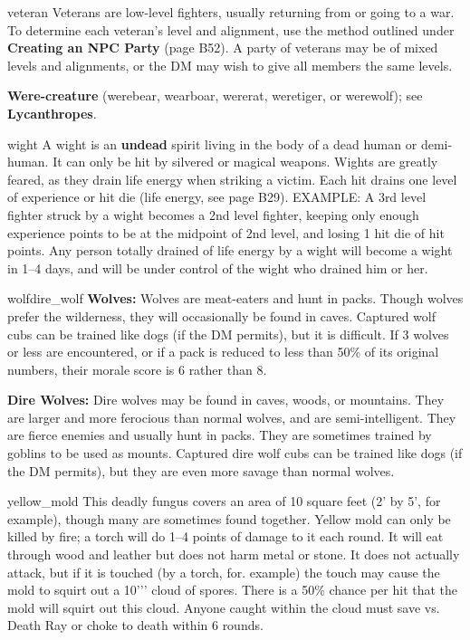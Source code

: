 \documentclass[letterpaper,serif,tightsqueeze]{module}
\begin{document}
\begin{newmonster}{veteran}
Veterans are low-level fighters, usually returning from or going to a
war. To determine each veteran's level and alignment, use the
method outlined under \textbf{Creating an NPC Party} (page B52). A
party of veterans may be of mixed levels and alignments, or the
DM may wish to give all members the same levels.
\end{newmonster}
\textbf{Were-creature} (werebear, wearboar, wererat, weretiger, or werewolf); see \textbf{Lycanthropes}.\\[1ex]
\begin{newmonster}{wight}
A wight is an \textbf{undead} spirit living in the body of a dead human or
demi-human. It can only be hit by silvered or magical weapons.
Wights are greatly feared, as they drain life energy when striking a
victim. Each hit drains one level of experience or hit die (life
energy, see page B29). EXAMPLE: A 3rd level fighter struck by a
wight becomes a 2nd level fighter, keeping only enough experience
points to be at the midpoint of 2nd level, and losing 1 hit die
of hit points. Any person totally drained of life energy by a wight
will become a wight in 1--4 days, and will be under control of the
wight who drained him or her.
\end{newmonster}
\begin{newmonster2}{wolf}{dire_wolf}
\textbf{Wolves:} Wolves are meat-eaters and hunt in packs. Though
wolves prefer the wilderness, they will occasionally be found in
caves. Captured wolf cubs can be trained like dogs (if the DM permits),
but it is difficult. If 3 wolves or less are encountered, or if a
pack is reduced to less than 50\% of its original numbers, their
morale score is 6 rather than 8.

\textbf{Dire Wolves:} Dire wolves may be found in caves, woods, or
mountains. They are larger and more ferocious than normal
wolves, and are semi-intelligent. They are fierce enemies and
usually hunt in packs. They are sometimes trained by goblins to be
used as mounts. Captured dire wolf cubs can be trained like dogs
(if the DM permits), but they are even more savage than normal
wolves.
\end{newmonster2}
\begin{newmonster}{yellow_mold}
This deadly fungus covers an area of 10 square feet (2' by 5', for
example), though many are sometimes found together. Yellow
mold can only be killed by fire; a torch will do 1--4 points of damage
to it each round. It will eat through wood and leather but does not
harm metal or stone. It does not actually attack, but if it is touched
(by a torch, for. example) the touch may cause the mold to squirt
out a 10''' cloud of spores. There is a 50\% chance per hit
that the mold will squirt out this cloud. Anyone caught within the
cloud must save vs. Death Ray or choke to death within 6 rounds.
\end{newmonster}
\end{document}
